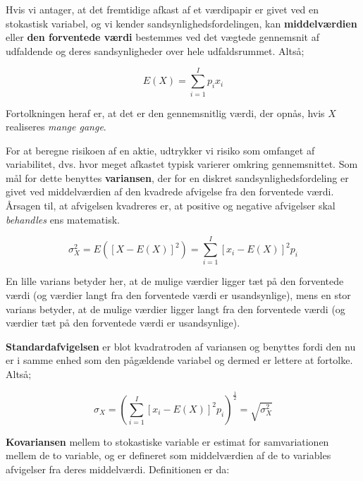 \documentclass[10pt,reqno, usenames]{article}
\begin{document}
\vspace{10 pt}

Hvis vi antager, at det fremtidige afkast af et værdipapir er givet ved en stokastisk variabel, og vi kender sandsynlighedsfordelingen, kan \textbf{middelværdien} eller \textbf{den forventede værdi} bestemmes ved det vægtede gennemsnit af udfaldende og deres sandsynligheder over hele udfaldsrummet. Altså; 

\begin{equation}
    E(X) = \sum_{i=1}^{I} p_i x_i
\end{equation}

Fortolkningen heraf er, at det er den gennemsnitlig værdi, der opnås, hvis $X$ realiseres \textit{mange gange}. 

\vspace{10 pt}

For at beregne risikoen af en aktie, udtrykker vi risiko som omfanget af
variabilitet, dvs. hvor meget afkastet typisk varierer omkring gennemsnittet. Som mål for dette benyttes \textbf{variansen}, der for en diskret sandsynlighedsfordeling er givet ved middelværdien af den kvadrede afvigelse fra den forventede værdi. Årsagen til, at afvigelsen kvadreres er, at positive og negative afvigelser skal \textit{behandles} ens matematisk. 

\begin{equation}
    \sigma_X^2 = E \left( [X - E(X)]^2 \right) = \sum_{i=1}^{I} \left[ x_i - E(X) \right]^2 p_i
\end{equation}

En lille varians betyder her, at de mulige værdier ligger tæt på den forventede værdi (og værdier langt fra den forventede værdi er usandsynlige), mens en stor varians betyder, at de mulige værdier ligger langt fra den forventede værdi (og værdier tæt på den forventede værdi er usandsynlige). 

\vspace{10 pt}

\textbf{Standardafvigelsen} er blot kvadratroden af variansen og benyttes fordi den nu er i samme enhed som den pågældende variabel og dermed er lettere at fortolke. Altså; 

\begin{equation}
    \sigma_X = \left( \sum_{i=1}^{I} \left[ x_i - E(X) \right]^2 p_i \right)^{\frac{1}{2}} = \sqrt{\sigma_X^2}
\end{equation}

\newpage
\textbf{Kovariansen} mellem to stokastiske variable er estimat for samvariationen mellem de to variable, og er defineret som middelværdien af de to variables afvigelser fra deres middelværdi. Definitionen er da: 
\end{document}
